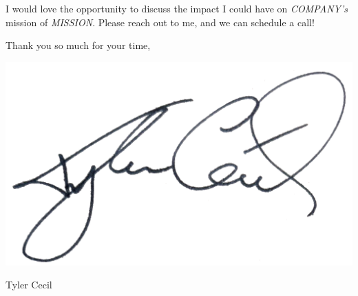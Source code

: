\documentclass[sans, a4paper, 11pt]{article}
\begin{document}
\begin{adjustwidth}{40pt}{40pt}
\begin{itemize}
  \end{itemize} \medskip


  I would love the opportunity to discuss the impact I could have on
  \emph{COMPANY's} mission of \emph{MISSION}. Please reach out to me, and we
  can schedule a call!  \bigskip

  \begin{minipage}{0.5\linewidth}
    Thank you so much for your time,
    \vspace{1em}
  \end{minipage}
  \begin{minipage}{0.5\linewidth}
    \vspace{-1em}
    \hfill\includegraphics[height=4.5\baselineskip]{sig}

    \vspace{-2em}
    \hfill Tyler Cecil
  \end{minipage}

\end{adjustwidth}
\end{document}

